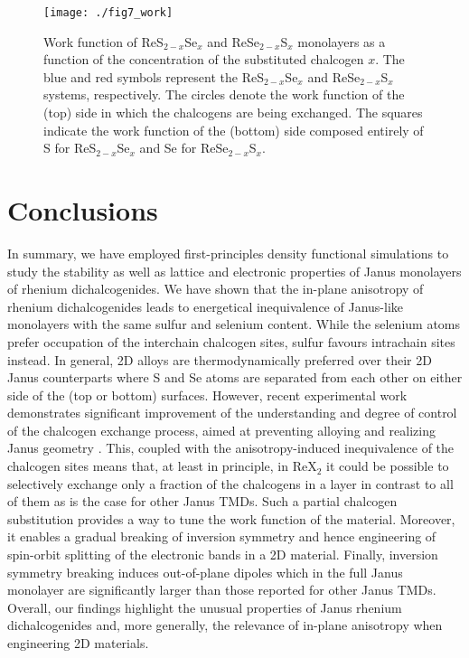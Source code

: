 \documentclass[reprint, superscriptaddress, amsmath,amssymb,prb,twocolumn]{revtex4-2}
\def\SSex{ReS$_{2-x}$Se$_x$}
\def\SeSx{ReSe$_{2-x}$S$_x$}
\begin{document}
\begin{figure}[!t]
\begin{center}
\texttt{[image: ./fig7\_work]}
\caption{Work function of \SSex{} and \SeSx{} monolayers as a function of the concentration of the substituted chalcogen $x$. The blue and red symbols represent the  \SSex{} and \SeSx{} systems, respectively. The circles denote the work function of the (top) side in which the chalcogens are being exchanged. The squares indicate the work function of the (bottom) side composed entirely of S for \SSex{} and Se for \SeSx{}.}
\label{fig:work_funk}
\end{center}
\end{figure}




\section{Conclusions}\label{sec.conclusions}
In summary, we have employed first-principles density functional simulations to study the stability as well as lattice and electronic properties of Janus monolayers of rhenium dichalcogenides. We have shown that the in-plane anisotropy of rhenium dichalcogenides leads to energetical inequivalence of Janus-like monolayers with the same sulfur and selenium content. While the selenium atoms prefer occupation of the interchain chalcogen sites, sulfur favours intrachain sites instead. In general, 2D alloys are thermodynamically preferred over their 2D Janus counterparts where S and Se atoms are separated from each other on either side of the (top or bottom) surfaces. However, recent experimental work demonstrates significant improvement of the understanding and degree of control of the chalcogen exchange process, aimed at preventing alloying and realizing Janus geometry \cite{lu_natnano_2017, zhang_acsnano_2017, Sant_2020, lin_acsnano_2020, qin_advmat_2022, jang_npgasiamater_2022}. This, coupled with the anisotropy-induced inequivalence of the chalcogen sites means that, at least in principle, in ReX$_{2}$ it could be possible to selectively exchange only a fraction of the chalcogens in a layer in contrast to all of them as is the case for other Janus TMDs. Such a partial chalcogen substitution provides a way to tune the work function of the material. Moreover, it enables a gradual breaking of inversion symmetry and hence engineering of spin-orbit splitting of the electronic bands in a 2D material. Finally, inversion symmetry breaking induces out-of-plane dipoles which in the full Janus monolayer are significantly larger than those reported for other Janus TMDs. Overall, our findings highlight the unusual properties of Janus rhenium dichalcogenides and, more generally, the relevance of in-plane anisotropy when engineering 2D materials.
\end{document}
